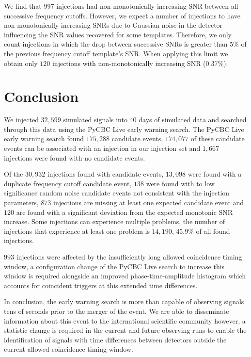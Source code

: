 We find that $997$ injections had non-monotonically increasing SNR between all successive frequency cutoffs. However, we expect a number of injections to have non-monotonically increasing SNRs due to Gaussian noise in the detector influencing the SNR values recovered for some templates. Therefore, we only count injections in which the drop between successive SNRs is greater than $5\%$ of the previous frequency cutoff template's SNR. When applying this limit we obtain only $120$ injections with non-monotonically increasing SNR ($0.37\%$).




\section{\label{6:sec:conclusion}Conclusion}

We injected $32,599$ simulated \gwadj signals into $40$ days of simulated \gwadj data and searched through this data using the PyCBC Live early warning search. The PyCBC Live early warning search found $175,288$ candidate events, $174,077$ of these candidate events can be associated with an injection in our injection set and $1,667$ injections were found with no candidate events.

Of the $30,932$ injections found with candidate events, $13,098$ were found with a duplicate frequency cutoff candidate event, $138$ were found with to low significance random noise candidate events not consistent with the injection parameters, $873$ injections are missing at least one expected candidate event and $120$ are found with a significant deviation from the expected monotonic SNR increase. Some injections can experience multiple problems, the number of injections that experience at least one problem is $14,190$, $45.9\%$ of all found injections.

$993$ injections were affected by the insufficiently long allowed coincidence timing window, a configuration change of the PyCBC Live search to increase this window is required alongside an improved phase-time-amplitude histogram which accounts for coincident \gwadj triggers at this extended time differences. 

In conclusion, the early warning search is more than capable of observing \gwadj signals tens of seconds prior to the merger of the \gwadj event. We are able to disseminate information about this event to the international scientific community however, a statistic change is required in the current and future observing runs to enable the identification of \gwadj signals with time differences between detectors outside the current allowed coincidence timing window.




